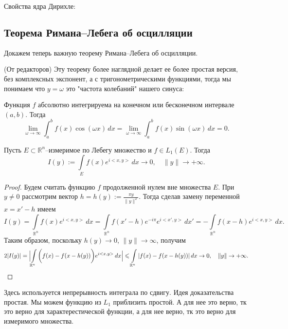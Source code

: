 Свойства ядра Дирихле:

\subsection{Теорема Римана--Лебега об осцилляции}

Докажем теперь важную теорему Римана--Лебега об осцилляции.
\begin{note}
    (От редакторов) Эту теорему более наглядной делает ее более простая версия, без комплексных экспонент, а с тригонометрическими функциями, тогда мы понимаем что $y=\omega$ это "частота колебаний" нашего синуса:

Функция \( f \) абсолютно интегрируема на конечном или бесконечном интервале \( (a, b) \). Тогда
\[
\lim_{\omega \to \infty} \int_a^b f(x) \cos(\omega x)\,dx = \lim_{\omega \to \infty} \int_a^b f(x) \sin(\omega x)\,dx = 0.
\]
\end{note}
    
\begin{theorem}
Пусть $E \subset \mathbb{R}^{n}$--измеримое по Лебегу множество и $f \in L_{1}(E)$. Тогда
\begin{equation}
\label{Th.Riemann_Lebesgue}
I(y):=\int\limits_{E}f(x)e^{i<x,y>}\,dx \to 0, \quad \|y\| \to +\infty.
\end{equation}
\end{theorem}
\begin{proof}
    Будем считать функцию $f$ продолженной нулем вне множества $E$. 
При $y \neq 0$ рассмотрим вектор $h=h(y):=\frac{\pi y}{\|y\|^{2}}$.
Тогда сделав замену переменной $x=x'-h$ имеем
$$
I(y)=\int\limits_{\mathbb{R}^{n}}f(x)e^{i<x,y>}\,dx = \int\limits_{\mathbb{R}^{n}}f(x'-h)e^{-i\pi}e^{i<x',y>}\,dx' = -\int\limits_{\mathbb{R}^{n}}f(x-h)e^{i<x,y>}\,dx.
$$
Таким образом, поскольку $h(y) \to 0$, $\|y\| \to \infty$, получим
\begin{equation}
2|I(y)| = \Bigl|\int\limits_{\mathbb{R}^{n}}\bigg(f(x)-f(x-h(y))\bigg)e^{i<x,y>}\,dx\Bigr| \le \int\limits_{\mathbb{R}^{n}}|f(x)-f(x-h(y))|\,dx \to 0, \quad \|y\| \to +\infty.
\end{equation}
\end{proof}
\begin{note}
    Здесь используется непрерывность интеграла по сдвигу. Идея доказательства простая. Мы можем функцию из $L_1$ приблизить простой. А для нее это верно, тк это верно для характерестической функции, а для нее верно, тк это верно для измеримого множества.
\end{note}



